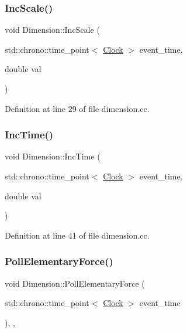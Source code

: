\mbox{\label{class_dimension_aa323eaa2c592e498d48e0739009ec313}} 
\subsubsection{\texorpdfstring{Inc\+Scale()}{IncScale()}}
{\footnotesize\ttfamily void Dimension\+::\+Inc\+Scale (\begin{DoxyParamCaption}\item[{std\+::chrono\+::time\+\_\+point$<$ \hyperlink{universe_8h_a0ef8d951d1ca5ab3cfaf7ab4c7a6fd80}{Clock} $>$}]{event\+\_\+time,  }\item[{double}]{val }\end{DoxyParamCaption})}



Definition at line 29 of file dimension.\+cc.

\mbox{\label{class_dimension_afc61c6d6d68ec0ed461458d504fec16f}} 
\subsubsection{\texorpdfstring{Inc\+Time()}{IncTime()}}
{\footnotesize\ttfamily void Dimension\+::\+Inc\+Time (\begin{DoxyParamCaption}\item[{std\+::chrono\+::time\+\_\+point$<$ \hyperlink{universe_8h_a0ef8d951d1ca5ab3cfaf7ab4c7a6fd80}{Clock} $>$}]{event\+\_\+time,  }\item[{double}]{val }\end{DoxyParamCaption})}



Definition at line 41 of file dimension.\+cc.

\mbox{\label{class_dimension_a5b07f5c8558233c8f3488baf1fe3459a}} 
\subsubsection{\texorpdfstring{Poll\+Elementary\+Force()}{PollElementaryForce()}}
{\footnotesize\ttfamily void Dimension\+::\+Poll\+Elementary\+Force (\begin{DoxyParamCaption}\item[{std\+::chrono\+::time\+\_\+point$<$ \hyperlink{universe_8h_a0ef8d951d1ca5ab3cfaf7ab4c7a6fd80}{Clock} $>$}]{event\+\_\+time }\end{DoxyParamCaption})\hspace{0.3cm}{\ttfamily [inline]}, {\ttfamily [final]}, {\ttfamily [virtual]}}



